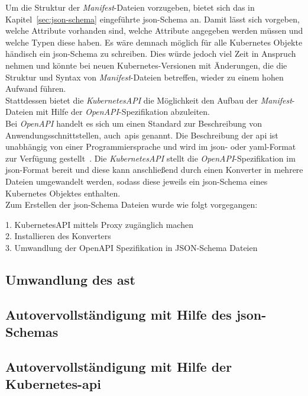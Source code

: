 Um die Struktur der \textit{Manifest}-Dateien vorzugeben, bietet sich das in Kapitel~\ref{sec:json-schema} eingeführte \acs{json}-Schema an.
Damit lässt sich vorgeben, welche Attribute vorhanden sind, welche Attribute angegeben werden müssen und welche Typen diese haben.
Es wäre demnach möglich für alle Kubernetes Objekte händisch ein \acs{json}-Schema zu schreiben. Dies würde jedoch viel Zeit in Anspruch nehmen und
könnte bei neuen Kubernetes-Versionen mit Änderungen, die die Struktur und Syntax von \textit{Manifest}-Dateien betreffen, wieder zu einem hohen Aufwand führen.
\\
Stattdessen bietet die \textit{KubernetesAPI} die Möglichkeit den Aufbau der \textit{Manifest}-Dateien mit Hilfe der \textit{OpenAPI}-Spezifikation abzuleiten.
\\
Bei \textit{OpenAPI} handelt es sich um einen Standard zur Beschreibung von Anwendungsschnittstellen, auch~\ac{apis} genannt. Die Beschreibung der \acs{api} ist
unabhängig von einer Programmiersprache und wird im \ac{json}- oder \ac{yaml}-Format zur Verfügung gestellt~\cite{openapi-org}.
Die \textit{KubernetesAPI} stellt die \textit{OpenAPI}-Spezifikation im \ac{json}-Format bereit und diese kann anschließend durch einen Konverter in
mehrere Dateien umgewandelt werden, sodass diese jeweils ein \acs{json}-Schema eines Kubernetes Objektes enthalten.
\\
Zum Erstellen der \acs{json}-Schema Dateien wurde wie folgt vorgegangen:

\begin{description}
      \item[1. KubernetesAPI mittels Proxy zugänglich machen]
      \item[2. Installieren des Konverters]
      \item[3. Umwandlung der OpenAPI Spezifikation in JSON-Schema Dateien]
\end{description}

\subsection{Umwandlung des \acs{ast}}

\subsection{Autovervollständigung mit Hilfe des \acs{json}-Schemas}

\subsection{Autovervollständigung mit Hilfe der Kubernetes-\acs{api}}

